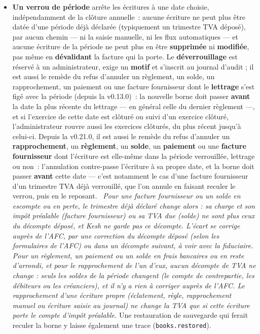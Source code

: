 \documentclass[a4paper,11pt,oneside]{article}
\begin{document}
\begin{itemize}
    \item \textbf{Un verrou de période} arrête les écritures à une date choisie, indépendamment de la clôture annuelle~: aucune écriture ne peut plus être datée d'une période déjà déclarée (typiquement un trimestre TVA déposé), par aucun chemin --- ni la saisie manuelle, ni les flux automatiques --- et aucune écriture de la période ne peut plus en être \textbf{supprimée} ni \textbf{modifiée}, pas même en \textbf{dévalidant} la facture qui la porte. Le \textbf{déverrouillage} est réservé à un administrateur, exige un \textbf{motif} et s'inscrit au journal d'audit ; il est aussi le remède du refus d'annuler un règlement, un solde, un rapprochement, un paiement ou une facture fournisseur dont le \textbf{lettrage} s'est figé avec la période (depuis la v0.13.0)~: la nouvelle borne doit passer \textbf{avant} la date la plus récente du lettrage --- en général celle du dernier règlement ---, et si l'exercice de cette date est clôturé ou suivi d'un exercice clôturé, l'administrateur rouvre aussi les exercices clôturés, du plus récent jusqu'à celui-ci. Depuis la v0.21.0, il est aussi le remède du refus d'annuler un \textbf{rapprochement}, un \textbf{règlement}, un \textbf{solde}, un \textbf{paiement} ou une \textbf{facture fournisseur} dont l'écriture est elle-même dans la période verrouillée, lettrage ou non~: l'annulation contre-passe l'écriture à sa propre date, et la borne doit passer \textbf{avant} cette date --- c'est notamment le cas d'une facture fournisseur d'un trimestre TVA déjà verrouillé, que l'on annule en faisant reculer le verrou, puis en le reposant. \keshAttention\ \emph{Pour une facture fournisseur ou un solde en escompte ou en perte, le trimestre déjà déclaré change alors : sa charge et son impôt préalable (facture fournisseur) ou sa TVA due (solde) ne sont plus ceux du décompte déposé, et Kesh ne garde pas ce décompte. L'écart se corrige auprès de l'AFC, par une correction du décompte déposé (selon les formulaires de l'AFC) ou dans un décompte suivant, à voir avec la fiduciaire. Pour un règlement, un paiement ou un solde en frais bancaires ou en reste d'arrondi, et pour le rapprochement de l'un d'eux, aucun décompte de TVA ne change : seuls les soldes de la période changent (le compte de contrepartie, les débiteurs ou les créanciers), et il n'y a rien à corriger auprès de l'AFC. Le rapprochement d'une écriture propre (éclatement, règle, rapprochement manuel ou écriture saisie au journal) ne change la TVA que si cette écriture porte le compte d'impôt préalable.} Une restauration de sauvegarde qui ferait reculer la borne y laisse également une trace (\texttt{books.restored}).

\end{itemize}
\end{document}
